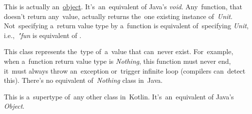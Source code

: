 
\label{kotlinunit}
This is actually an~\hyperref[kotlinobject]{object}.
It's~an~equivalent of Java's \textit{void}.
Any~function, that doesn't return any~value, actually returns the~one existing instance \mbox{of \textit{Unit}}.
Not~specifying a~return value type by a~function is equivalent of~specifying \textit{Unit}, \mbox{i.e., \textit{"fun}}  is equivalent of .

\label{kotlinnothing}
This class represents the~type of~a~value that can~never exist.
For~example, when a~function return value type is \textit{Nothing}, this function must never end, it~must always throw an~exception or~trigger infinite loop (compilers can~detect this).
There's no equivalent \mbox{of \textit{Nothing}} class in~Java.

This is a~supertype of~any other class in~Kotlin.
It's~an~equivalent of Java's \textit{Object}.
\newpage
